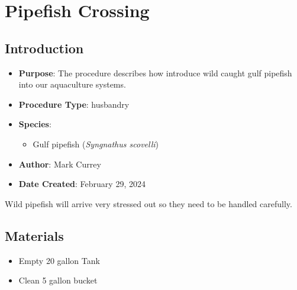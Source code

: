 \documentclass[
  letterpaper,
  DIV=11,
  numbers=noendperiod]{scrreprt}
\providecommand{\tightlist}{%
  \setlength{\itemsep}{0pt}\setlength{\parskip}{0pt}}\usepackage{longtable,booktabs,array}
\begin{document}
\hypertarget{sec-husbandry_wild_syng_introduction}{%
\chapter{Pipefish Crossing}\label{sec-husbandry_wild_syng_introduction}}

\hypertarget{introduction-56}{%
\section{Introduction}\label{introduction-56}}

\begin{itemize}
\tightlist
\item
  \textbf{Purpose}: The procedure describes how introduce wild caught
  gulf pipefish into our aquaculture systems.
\item
  \textbf{Procedure Type}: husbandry
\item
  \textbf{Species}:

  \begin{itemize}
  \tightlist
  \item
    Gulf pipefish (\emph{Syngnathus scovelli})
  \end{itemize}
\item
  \textbf{Author}: Mark Currey\\
\item
  \textbf{Date Created}: February 29, 2024
\end{itemize}

\begin{tcolorbox}[enhanced jigsaw, rightrule=.15mm, title=\textcolor{quarto-callout-note-color}{\faInfo}\hspace{0.5em}{NOTES}, titlerule=0mm, opacitybacktitle=0.6, toprule=.15mm, bottomrule=.15mm, opacityback=0, left=2mm, colframe=quarto-callout-note-color-frame, breakable, coltitle=black, colback=white, colbacktitle=quarto-callout-note-color!10!white, bottomtitle=1mm, leftrule=.75mm, toptitle=1mm, arc=.35mm]

Wild pipefish will arrive very stressed out so they need to be handled
carefully.

\end{tcolorbox}

\hypertarget{materials-54}{%
\section{Materials}\label{materials-54}}

\begin{itemize}
\tightlist
\item
  Empty 20 gallon Tank
\item
  Clean 5 gallon bucket
\end{itemize}
\end{document}
